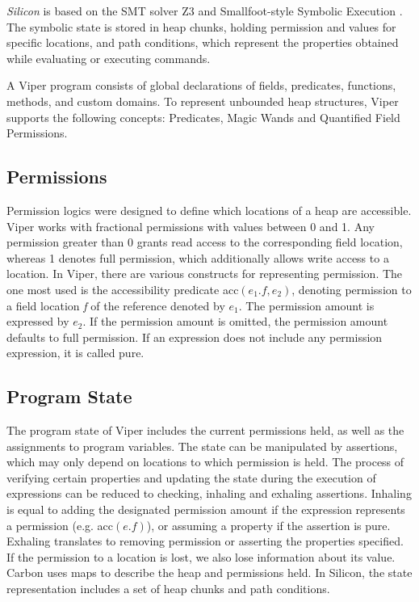 \documentclass[12pt]{article}
\begin{document}
\textit{Silicon} is based on the SMT solver Z3 \cite{de2008z3} and Smallfoot-style Symbolic Execution \cite{berdine2005smallfoot}. The symbolic state is stored in heap chunks, holding permission and values for specific locations, and path conditions, which represent the properties obtained while evaluating or executing commands.

A Viper program consists of global declarations of fields, predicates, functions, methods, and custom domains. To represent unbounded heap structures, Viper supports the following concepts: Predicates, Magic Wands and Quantified Field Permissions.

\subsection{Permissions}
Permission logics were designed to define which locations of a heap are accessible. Viper works with fractional permissions with values between 0 and 1. Any permission greater than 0 grants read access to the corresponding field location, whereas 1 denotes full permission, which additionally allows write access to a location. 
In Viper, there are various constructs for representing permission. The one most used is the accessibility predicate acc\((e_1.f, e_2)\), denoting permission to a field location \textit{f} of the reference denoted by \(e_1\). The permission amount is expressed by \(e_2\). If the permission amount is omitted, the permission amount defaults to full permission. If an expression does not include any permission expression, it is called pure.

\subsection{Program State}
The program state of Viper includes the current permissions held, as well as the assignments to program variables. The state can be manipulated by assertions, which may only depend on locations to which permission is held. The process of verifying certain properties and updating the state during the execution of expressions can be reduced to checking, inhaling and exhaling assertions. Inhaling is equal to adding the designated permission amount if the expression represents a permission (e.g. acc\((e.f)\)), or assuming a property if the assertion is pure. Exhaling translates to removing permission or asserting the properties specified. If the permission to a location is lost, we also lose information about its value.
Carbon uses maps to describe the heap and permissions held. In Silicon, the state representation includes a set of heap chunks and path conditions.
\end{document}
